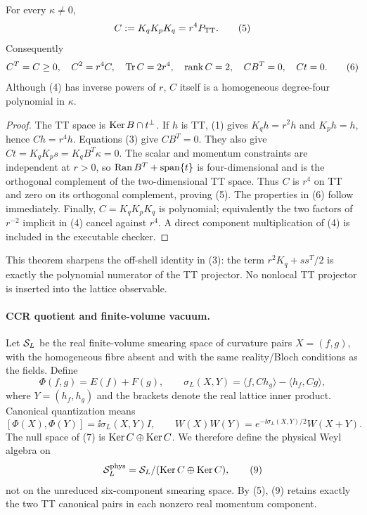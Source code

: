 \begin{theorem}
For every $\kappa\ne0$,
\[
 C:=K_qK_pK_q=r^4P_{\mathrm{TT}}.                          \tag{5}
\]
Consequently
\[
 C^T=C\ge0,\quad C^2=r^4C,\quad \operatorname{Tr} C=2r^4,
\quad \operatorname{rank}C=2,
\quad CB^T=0,\quad Ct=0.                           \tag{6}
\]
Although (4) has inverse powers of $r$, $C$ itself is a homogeneous
degree-four polynomial in $\kappa$.
\end{theorem}

\begin{proof}
The TT space is $\operatorname{Ker} B\cap t^\perp$.  If $h$ is TT, (1) gives
$K_qh=r^2h$ and $K_ph=h$, hence $Ch=r^4h$.  Equations (3) give
$CB^T=0$.  They also give
$Ct=K_qK_ps=K_qB^T\kappa=0$.  The scalar and momentum constraints are
independent at $r>0$, so
$\operatorname{Ran} B^T+\operatorname{span}\{t\}$ is four-dimensional and is the
orthogonal complement of the two-dimensional TT space.  Thus $C$ is $r^4$
on TT and zero on its orthogonal complement, proving (5).  The properties in
(6) follow immediately.  Finally, $C=K_qK_pK_q$ is polynomial; equivalently
the two factors of $r^{-2}$ implicit in (4) cancel against $r^4$.  A direct
component multiplication of (4) is included in the executable checker.
\end{proof}

This theorem sharpens the off-shell identity in (3): the term
$r^2K_q+ss^T/2$ is exactly the polynomial numerator of the TT projector.  No
nonlocal TT projector is inserted into the lattice observable.

\paragraph{CCR quotient and finite-volume vacuum.}

Let $\mathcal S_L$ be the real finite-volume smearing space of curvature pairs
$X=(f,g)$, with the homogeneous fibre absent and with the same reality/Bloch
conditions as the fields.  Define
\[
 \Phi(f,g)=E(f)+F(g),\qquad
 \sigma_L(X,Y)=\langle f,C h_g\rangle-
                  \langle h_f,Cg\rangle,           \tag{7}
\]
where $Y=(h_f,h_g)$ and the brackets denote the real lattice inner product.
Canonical quantization means
\[
 [\Phi(X),\Phi(Y)]=\ii\sigma_L(X,Y)I,\qquad
 W(X)W(Y)=e^{-\ii\sigma_L(X,Y)/2}W(X+Y).           \tag{8}
\]
The null space of (7) is $\operatorname{Ker} C\oplus\operatorname{Ker} C$.  We therefore define the
physical Weyl algebra on
\[
 \mathcal S_L^{\rm phys}=\mathcal S_L/(\operatorname{Ker} C\oplus\operatorname{Ker} C),      \tag{9}
\]
not on the unreduced six-component smearing space.  By (5), (9) retains
exactly the two TT canonical pairs in each nonzero real momentum component.

